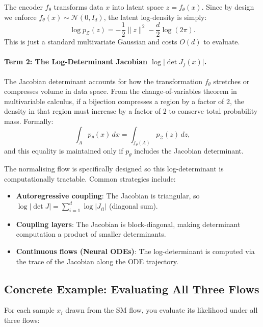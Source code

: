\documentclass[11pt, a4paper]{article}
\begin{document}
The encoder $f_\theta$ transforms data $x$ into latent space $z = f_\theta(x)$.
Since by design we enforce $f_\theta(x) \sim \mathcal{N}(0, I_d)$, the latent
log-density is simply:
\begin{equation}
    \log p_\mathcal{Z}(z) = -\frac{1}{2}\|z\|^2 - \frac{d}{2}\log(2\pi).
\end{equation}
This is just a standard multivariate Gaussian and costs $O(d)$ to evaluate.

\paragraph{Term 2: The Log-Determinant Jacobian $\log|\det J_f(x)|$.}

The Jacobian determinant accounts for how the transformation $f_\theta$ stretches or compresses volume in data space.
From the change-of-variables theorem in multivariable calculus, if a bijection
compresses a region by a factor of 2, the density in that region must increase
by a factor of 2 to conserve total probability mass.
Formally:
\begin{equation}
    \int_A p_\theta(x) \, dx = \int_{f_\theta(A)} p_\mathcal{Z}(z) \, dz,
\end{equation}
and this equality is maintained only if $p_\theta$ includes the Jacobian determinant.

The normalising flow is specifically designed so this log-determinant is
computationally tractable. Common strategies include:
\begin{itemize}
    \item \textbf{Autoregressive coupling}: The Jacobian is triangular, so
          $\log|\det J| = \sum_{i=1}^d \log|J_{ii}|$ (diagonal sum).
    \item \textbf{Coupling layers}: The Jacobian is block-diagonal, making
          determinant computation a product of smaller determinants.
    \item \textbf{Continuous flows (Neural ODEs)}: The log-determinant is
          computed via the trace of the Jacobian along the ODE trajectory.
\end{itemize}

\subsection{Concrete Example: Evaluating All Three Flows}

For each sample $x_i$ drawn from the SM flow, you evaluate its likelihood under
all three flows:
\end{document}
